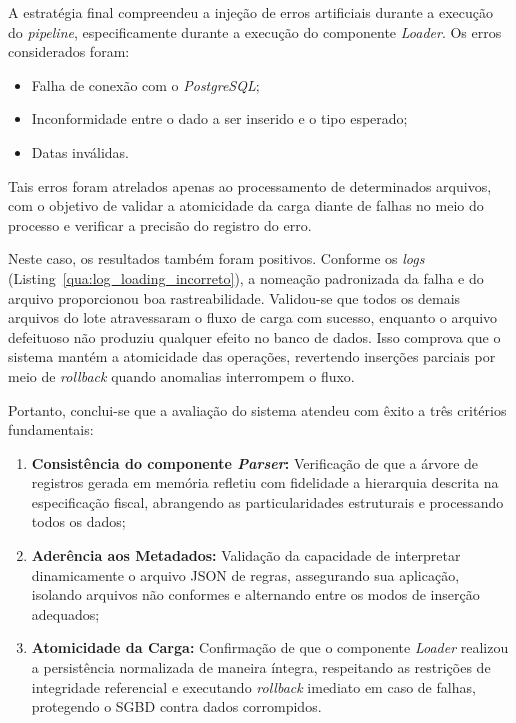 

A estratégia final compreendeu a injeção de erros artificiais durante a execução
do \textit{pipeline}, especificamente durante a execução do componente
\textit{Loader}. Os erros considerados foram:
\begin{itemize}
    \item Falha de conexão com o \textit{PostgreSQL};
    \item Inconformidade entre o dado a ser inserido e o tipo esperado;
    \item Datas inválidas.
\end{itemize}
Tais erros foram atrelados apenas ao processamento de determinados arquivos,
com o objetivo de validar a atomicidade da carga diante de falhas no meio do
processo e verificar a precisão do registro do erro.

Neste caso, os resultados também foram positivos. Conforme os \textit{logs}
(Listing~\ref{qua:log_loading_incorreto}), a nomeação padronizada da falha e do
arquivo proporcionou boa rastreabilidade. Validou-se que todos os demais
arquivos do lote atravessaram o fluxo de carga com sucesso, enquanto o arquivo
defeituoso não produziu qualquer efeito no banco de dados. Isso comprova que o
sistema mantém a atomicidade das operações, revertendo inserções parciais
por meio de \textit{rollback} quando anomalias interrompem o fluxo.


Portanto, conclui-se que a avaliação do sistema atendeu com êxito a três
critérios fundamentais:
\begin{enumerate}
    \item \textbf{Consistência do componente \textit{Parser}:} Verificação de
    que a árvore de registros gerada em memória refletiu com fidelidade a
    hierarquia descrita na especificação fiscal, abrangendo as particularidades
    estruturais e processando todos os dados;
    \item \textbf{Aderência aos Metadados:} Validação da capacidade de
    interpretar dinamicamente o arquivo JSON de regras, assegurando sua
    aplicação, isolando arquivos não conformes e alternando entre os modos
    de inserção adequados;
    \item \textbf{Atomicidade da Carga:} Confirmação de que o componente
    \textit{Loader} realizou a persistência normalizada de maneira íntegra,
    respeitando as restrições de integridade referencial e executando
    \textit{rollback} imediato em caso de falhas, protegendo o SGBD contra
    dados corrompidos.
\end{enumerate}

